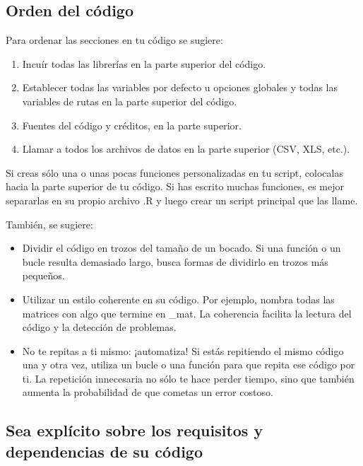 \documentclass[
]{book}
\providecommand{\tightlist}{%
  \setlength{\itemsep}{0pt}\setlength{\parskip}{0pt}}
\begin{document}
\hypertarget{orden-del-cuxf3digo}{%
\subsection{\texorpdfstring{\textbf{Orden del código}}{Orden del código}}\label{orden-del-cuxf3digo}}

Para ordenar las secciones en tu código se sugiere:

\begin{enumerate}
\def\labelenumi{\arabic{enumi}.}
\tightlist
\item
  Incuír todas las librerías en la parte superior del código.
\item
  Establecer todas las variables por defecto u opciones globales y todas las variables de rutas en la parte superior del código.
\item
  Fuentes del código y créditos, en la parte superior.
\item
  Llamar a todos los archivos de datos en la parte superior (CSV, XLS, etc.).
\end{enumerate}

Si creas sólo una o unas pocas funciones personalizadas en tu script, colocalas hacia la parte superior de tu código. Si has escrito muchas funciones, es mejor separarlas en su propio archivo .R y luego crear un script principal que las llame.

También, se sugiere:

\begin{itemize}
\item
  Dividir el código en trozos del tamaño de un bocado. Si una función o un bucle resulta demasiado largo, busca formas de dividirlo en trozos más pequeños.
\item
  Utilizar un estilo coherente en su código. Por ejemplo, nombra todas las matrices con algo que termine en \_mat. La coherencia facilita la lectura del código y la detección de problemas.
\item
  No te repitas a ti mismo: ¡automatiza! Si estás repitiendo el mismo código una y otra vez, utiliza un bucle o una función para que repita ese código por ti. La repetición innecesaria no sólo te hace perder tiempo, sino que también aumenta la probabilidad de que cometas un error costoso.
\end{itemize}

\hypertarget{sea-expluxedcito-sobre-los-requisitos-y-dependencias-de-su-cuxf3digo}{%
\subsection{\texorpdfstring{\textbf{Sea explícito sobre los requisitos y dependencias de su código}}{Sea explícito sobre los requisitos y dependencias de su código}}\label{sea-expluxedcito-sobre-los-requisitos-y-dependencias-de-su-cuxf3digo}}
\end{document}
